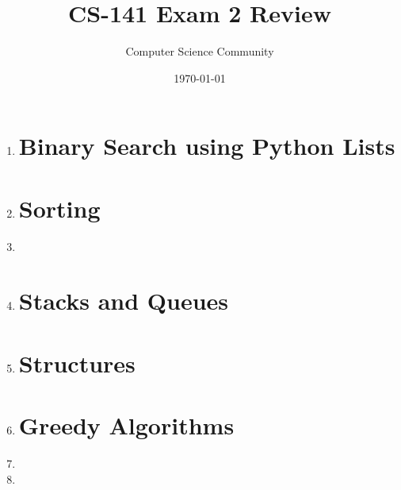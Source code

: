 \documentclass[11pt]{article}
\title{CS-141 Exam 2 Review}
\author{Computer Science Community}
\date{\today}
\begin{document}
\header

\begin{enumerate}

\section*{Linked Lists}
    \item 

\newpage

\section*{Binary Search using Python Lists}
	\item 

\section*{Sorting}
	\item 
\newpage
	\item 

\newpage
\section*{Stacks and Queues}
	\item 

\newpage

\section*{Structures}
	\item 
	
\newpage
\section*{Greedy Algorithms}
	\item 
	
	\vspace{.25in}
	
	\item 

\end{enumerate}
\end{document}
